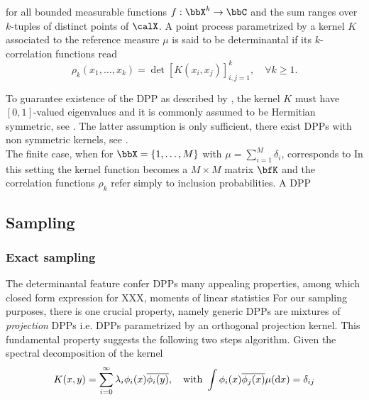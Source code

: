 \documentclass[twoside,11pt]{article}
\begin{document}
    for all bounded measurable functions $f:\bbX^k\to \bbC$ and the sum ranges over $k$-tuples of distinct points of $\calX$. 
    A point process parametrized by a kernel $K$ associated to the reference measure $\mu$ is said to be determinantal if its $k$-correlation functions read
    \begin{equation}
    \label{eq:k-correlation_function_DPP}
      \rho_k(x_1,\dots,x_k) 
        = \det [K(x_i, x_j)]_{i,j=1}^k,
      \quad \forall k\geq 1.
    \end{equation}

    To guarantee existence of the DPP as described by , the kernel $K$ must have $[0,1]$-valued eigenvalues and it is commonly assumed to be Hermitian symmetric, see \citep[Theorem 2; Theorem 3]{HKPV06, Sos00}.
    The latter assumption is only sufficient, there exist DPPs with non symmetric kernels, see \citep{BoDiFu09}.\\

    The finite case, when for $\bbX = \lrcb{1,\dots,M}$ with $\mu=\sum_{i=1}^M \delta_i$, corresponds to 
    In this setting the kernel function becomes a $M\times M$ matrix $\bfK$ and the correlation functions $\rho_k$ refer simply to inclusion probabilities.
    A DPP


  \subsection{Sampling} %
  \label{sub:sampling}
  
    \subsubsection{Exact sampling} %
    \label{ssub:exact_sampling}

      The determinantal feature confer DPPs many appealing properties, among which closed form expression for XXX, moments of linear statistics \etc
      For our sampling purposes, there is one crucial property, namely generic DPPs are mixtures of \textit{projection} DPPs i.e. DPPs parametrized by an orthogonal projection kernel.
      This fundamental property suggests the following two steps algorithm.
      Given the spectral decomposition of the kernel 
      \begin{equation}
      \label{eq:eigdec_kernel}
        K(x,y)=\sum\limits_{i=0}^{\infty} \lambda_i \phi_i(x) \overline{\phi_i(y)},
        \quad \text{with }
        \int \phi_i(x) \overline{\phi_j(x)} \mu(\mathop{}\!\mathrm{d} x) = \delta_{ij}
      \end{equation}
\end{document}

